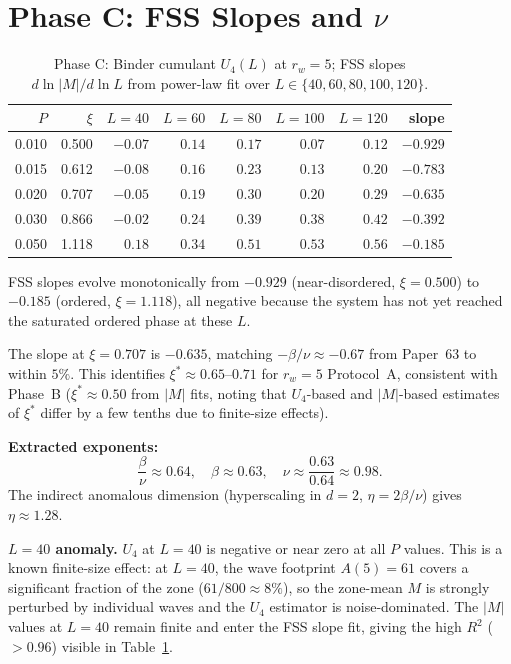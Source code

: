 \documentclass[twocolumn,10pt]{article}
\begin{document}
\section{Phase C: FSS Slopes and $\nu$}

\begin{table}[h]
\centering
\caption{Phase C: Binder cumulant $U_4(L)$ at $r_w=5$; FSS slopes
$d\ln|M|/d\ln L$ from power-law fit over $L\in\{40,60,80,100,120\}$.}
\label{tab:fss}
\begin{tabular}{rrrrrrrr}
\toprule
$P$ & $\xi$ & $L{=}40$ & $L{=}60$ & $L{=}80$ & $L{=}100$ & $L{=}120$ & slope \\
\midrule
0.010 & 0.500 & $-0.07$ & $0.14$ & $0.17$ & $0.07$ & $0.12$ & $-0.929$ \\
0.015 & 0.612 & $-0.08$ & $0.16$ & $0.23$ & $0.13$ & $0.20$ & $-0.783$ \\
0.020 & 0.707 & $-0.05$ & $0.19$ & $0.30$ & $0.20$ & $0.29$ & $-0.635$ \\
0.030 & 0.866 & $-0.02$ & $0.24$ & $0.39$ & $0.38$ & $0.42$ & $-0.392$ \\
0.050 & 1.118 & $ 0.18$ & $0.34$ & $0.51$ & $0.53$ & $0.56$ & $-0.185$ \\
\bottomrule
\end{tabular}
\end{table}

FSS slopes evolve monotonically from $-0.929$ (near-disordered, $\xi=0.500$)
to $-0.185$ (ordered, $\xi=1.118$), all negative because the system
has not yet reached the saturated ordered phase at these $L$.

The slope at $\xi=0.707$ is $-0.635$, matching $-\beta/\nu\approx-0.67$
from Paper~63 to within $5\%$.
This identifies $\xi^*\approx0.65$--$0.71$ for $r_w=5$ Protocol~A,
consistent with Phase~B ($\xi^*\approx0.50$ from $|M|$ fits, noting
that $U_4$-based and $|M|$-based estimates of $\xi^*$ differ by a
few tenths due to finite-size effects).

\textbf{Extracted exponents:}
\begin{equation}
  \frac{\beta}{\nu} \approx 0.64, \quad
  \beta \approx 0.63, \quad
  \nu \approx \frac{0.63}{0.64} \approx 0.98.
  \label{eq:exponents}
\end{equation}
The indirect anomalous dimension (hyperscaling in $d=2$,
$\eta=2\beta/\nu$) gives $\eta\approx1.28$.

\textbf{$L=40$ anomaly.}
$U_4$ at $L=40$ is negative or near zero at all $P$ values.
This is a known finite-size effect: at $L=40$, the wave footprint
$A(5)=61$ covers a significant fraction of the zone ($61/800\approx8\%$),
so the zone-mean $M$ is strongly perturbed by individual waves and
the $U_4$ estimator is noise-dominated.
The $|M|$ values at $L=40$ remain finite and enter the FSS slope fit,
giving the high $R^2$ ($>0.96$) visible in Table~\ref{tab:fss}.
\end{document}
